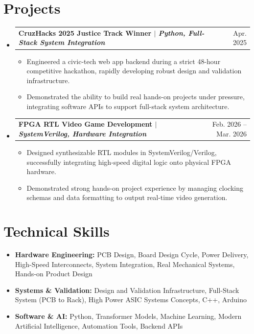 \documentclass[letterpaper,11pt]{article}
\makeatletter
\newcommand{\resumeItem}[1]{\item{#1}}
\newcommand{\resumeProjectHeading}[2]{
  \item
    \begin{tabular*}{0.97\textwidth}[t]{l@{\extracolsep{\fill}}r}
      \textbf{#1} & #2 \\
    \end{tabular*}
}
\newcommand{\resumeSubHeadingListStart}{\begin{itemize}[label=\textbullet]}
\newcommand{\resumeSubHeadingListEnd}{\end{itemize}}
\newcommand{\resumeItemListStart}{\begin{itemize}[label=-]}
\newcommand{\resumeItemListEnd}{\end{itemize}}
\makeatother
\begin{document}
\section{Projects}
\resumeSubHeadingListStart
  \resumeProjectHeading{CruzHacks 2025 Justice Track Winner $\vert$ \emph{Python, Full-Stack System Integration}}{Apr. 2025}
  \resumeItemListStart
    \resumeItem{Engineered a civic-tech web app backend during a strict 48-hour competitive hackathon, rapidly developing robust design and validation infrastructure.}
    \resumeItem{Demonstrated the ability to build real hands-on projects under pressure, integrating software APIs to support full-stack system architecture.}
  \resumeItemListEnd
  \resumeProjectHeading{FPGA RTL Video Game Development $\vert$ \emph{SystemVerilog, Hardware Integration}}{Feb. 2026 -- Mar. 2026}
  \resumeItemListStart
    \resumeItem{Designed synthesizable RTL modules in SystemVerilog/Verilog, successfully integrating high-speed digital logic onto physical FPGA hardware.}
    \resumeItem{Demonstrated strong hands-on project experience by managing clocking schemas and data formatting to output real-time video generation.}
  \resumeItemListEnd
\resumeSubHeadingListEnd

\section{Technical Skills}
\resumeSubHeadingListStart
  \item{\textbf{Hardware Engineering:} PCB Design, Board Design Cycle, Power Delivery, High-Speed Interconnects, System Integration, Real Mechanical Systems, Hands-on Product Design}
  \item{\textbf{Systems \& Validation:} Design and Validation Infrastructure, Full-Stack System (PCB to Rack), High Power ASIC Systems Concepts, C++, Arduino}
  \item{\textbf{Software \& AI:} Python, Transformer Models, Machine Learning, Modern Artificial Intelligence, Automation Tools, Backend APIs}
\resumeSubHeadingListEnd
\end{document}
